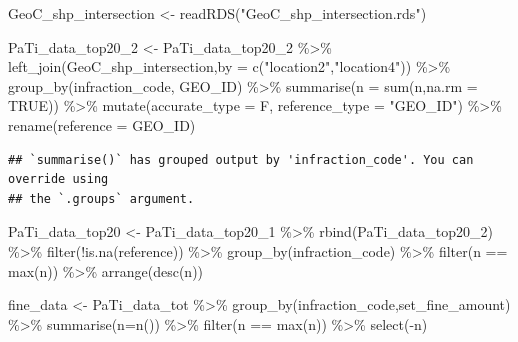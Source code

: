 \documentclass[
]{article}
\newenvironment{Shaded}{\begin{snugshade}}{\end{snugshade}}
\newcommand{\AttributeTok}[1]{\textcolor[rgb]{0.77,0.63,0.00}{#1}}
\newcommand{\ConstantTok}[1]{\textcolor[rgb]{0.00,0.00,0.00}{#1}}
\newcommand{\FunctionTok}[1]{\textcolor[rgb]{0.00,0.00,0.00}{#1}}
\newcommand{\NormalTok}[1]{#1}
\newcommand{\OtherTok}[1]{\textcolor[rgb]{0.56,0.35,0.01}{#1}}
\newcommand{\SpecialCharTok}[1]{\textcolor[rgb]{0.00,0.00,0.00}{#1}}
\newcommand{\StringTok}[1]{\textcolor[rgb]{0.31,0.60,0.02}{#1}}
\begin{document}
\begin{Shaded}
\begin{Highlighting}[]
\NormalTok{GeoC\_shp\_intersection }\OtherTok{\textless{}{-}} \FunctionTok{readRDS}\NormalTok{(}\StringTok{"GeoC\_shp\_intersection.rds"}\NormalTok{)}


\NormalTok{PaTi\_data\_top20\_2 }\OtherTok{\textless{}{-}}\NormalTok{ PaTi\_data\_top20\_2 }\SpecialCharTok{\%\textgreater{}\%} \FunctionTok{left\_join}\NormalTok{(GeoC\_shp\_intersection,}\AttributeTok{by =} \FunctionTok{c}\NormalTok{(}\StringTok{"location2"}\NormalTok{,}\StringTok{"location4"}\NormalTok{)) }\SpecialCharTok{\%\textgreater{}\%} 
  \FunctionTok{group\_by}\NormalTok{(infraction\_code, GEO\_ID) }\SpecialCharTok{\%\textgreater{}\%}
  \FunctionTok{summarise}\NormalTok{(}\AttributeTok{n =} \FunctionTok{sum}\NormalTok{(n,}\AttributeTok{na.rm =} \ConstantTok{TRUE}\NormalTok{)) }\SpecialCharTok{\%\textgreater{}\%} 
  \FunctionTok{mutate}\NormalTok{(}\AttributeTok{accurate\_type =}\NormalTok{ F,}
         \AttributeTok{reference\_type =} \StringTok{"GEO\_ID"}\NormalTok{) }\SpecialCharTok{\%\textgreater{}\%} 
  \FunctionTok{rename}\NormalTok{(}\AttributeTok{reference =}\NormalTok{ GEO\_ID)}
\end{Highlighting}
\end{Shaded}

\begin{verbatim}
## `summarise()` has grouped output by 'infraction_code'. You can override using
## the `.groups` argument.
\end{verbatim}

\begin{Shaded}
\begin{Highlighting}[]
\NormalTok{PaTi\_data\_top20 }\OtherTok{\textless{}{-}}\NormalTok{ PaTi\_data\_top20\_1 }\SpecialCharTok{\%\textgreater{}\%}
  \FunctionTok{rbind}\NormalTok{(PaTi\_data\_top20\_2) }\SpecialCharTok{\%\textgreater{}\%} 
  \FunctionTok{filter}\NormalTok{(}\SpecialCharTok{!}\FunctionTok{is.na}\NormalTok{(reference)) }\SpecialCharTok{\%\textgreater{}\%} 
  \FunctionTok{group\_by}\NormalTok{(infraction\_code) }\SpecialCharTok{\%\textgreater{}\%}
  \FunctionTok{filter}\NormalTok{(n }\SpecialCharTok{==} \FunctionTok{max}\NormalTok{(n)) }\SpecialCharTok{\%\textgreater{}\%} 
  \FunctionTok{arrange}\NormalTok{(}\FunctionTok{desc}\NormalTok{(n))}
\end{Highlighting}
\end{Shaded}

\begin{Shaded}
\begin{Highlighting}[]
\NormalTok{fine\_data }\OtherTok{\textless{}{-}}\NormalTok{ PaTi\_data\_tot }\SpecialCharTok{\%\textgreater{}\%} \FunctionTok{group\_by}\NormalTok{(infraction\_code,set\_fine\_amount) }\SpecialCharTok{\%\textgreater{}\%} \FunctionTok{summarise}\NormalTok{(}\AttributeTok{n=}\FunctionTok{n}\NormalTok{()) }\SpecialCharTok{\%\textgreater{}\%} \FunctionTok{filter}\NormalTok{(n }\SpecialCharTok{==} \FunctionTok{max}\NormalTok{(n)) }\SpecialCharTok{\%\textgreater{}\%} \FunctionTok{select}\NormalTok{(}\SpecialCharTok{{-}}\NormalTok{n)}
\end{Highlighting}
\end{Shaded}
\end{document}
